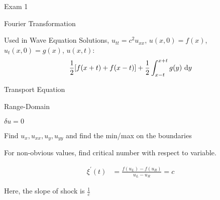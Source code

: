 \documentclass{article}
\begin{document}
\begin{multicols}{2}
  {Exam 1}


  {Fourier Transformation}


  Used in Wave Equation Solutions, $u_{tt} = c^2 u_{xx}$, $u(x, 0) = f(x)$, $u_t(x, 0) = g(x)$, $u(x, t)$:
  \begin{align}
    \frac{1}{2} [f(x + t) + f(x - t)] + \frac{1}{2} \int^{x + t}_{x - t} g(y)\ \text dy
  \end{align}


  {Transport Equation}


  {Range-Domain}


  $\delta u = 0$

  Find $u_x, u_{xx}, u_y, u_{yy}$ and find the min/max on the boundaries

  For non-obvious values, find critical number with respect to variable.

  \begin{align}
    \xi^\prime(t) & =
    \frac{f(u_L) - f(u_R)}{u_L - u_R} = c
  \end{align}

  Here, the slope of shock is $\frac{1}{c}$
\end{multicols}
\end{document}
